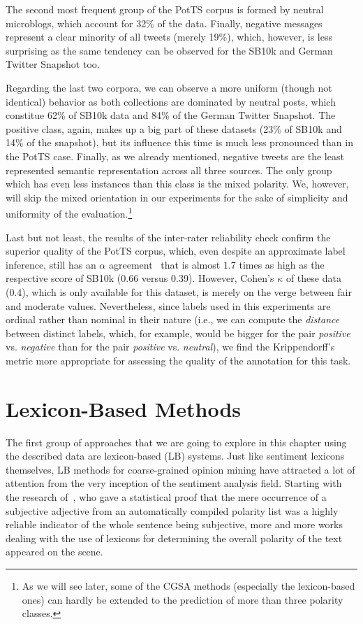 The second most frequent group of the PotTS corpus is formed by
neutral microblogs, which account for 32\% of the data.  Finally,
negative messages represent a clear minority of all tweets (merely
19\%), which, however, is less surprising as the same tendency can be
observed for the SB10k and German Twitter Snapshot too.

Regarding the last two corpora, we can observe a more uniform (though
not identical) behavior as both collections are dominated by neutral
posts, which constitue 62\% of SB10k data and 84\% of the German
Twitter Snapshot.  The positive class, again, makes up a big part of
these datasets (23\% of SB10k and 14\% of the snapshot), but its
influence this time is much less pronounced than in the PotTS case.
Finally, as we already mentioned, negative tweets are the least
represented semantic representation across all three sources.  The
only group which has even less instances than this class is the mixed
polarity.  We, however, will skip the mixed orientation in our
experiments for the sake of simplicity and uniformity of the
evaluation.\footnote{As we will see later, some of the CGSA methods
  (especially the lexicon-based ones) can hardly be extended to the
  prediction of more than three polarity classes.}

Last but not least, the results of the inter-rater reliability check
confirm the superior quality of the PotTS corpus, which, even despite
an approximate label inference, still has an $\alpha$
agreement~\cite{Krippendorff:07} that is almost 1.7 times as high as
the respective score of SB10k (0.66 versus 0.39).  However, Cohen's
$\kappa$ of these data (0.4), which is only available for this
dataset, is merely on the verge between fair and moderate values.
Nevertheless, since labels used in this experiments are ordinal rather
than nominal in their nature (i.e., we can compute the \emph{distance}
between distinct labels, which, for example, would be bigger for the
pair \emph{positive} vs. \emph{negative} than for the pair
\emph{positive} vs. \emph{neutral}), we find the Krippendorff's metric
more appropriate for assessing the quality of the annotation for this
task.

\section{Lexicon-Based Methods}\label{sec:cgsa:lexicon-based}

The first group of approaches that we are going to explore in this
chapter using the described data are lexicon-based (LB) systems.  Just
like sentiment lexicons themselves, LB methods for coarse-grained
opinion mining have attracted a lot of attention from the very
inception of the sentiment analysis field.  Starting with the research
of~\citet{Hatzivassi:00}, who gave a statistical proof that the mere
occurrence of a subjective adjective from an automatically compiled
polarity list was a highly reliable indicator of the whole sentence
being subjective, more and more works dealing with the use of lexicons
for determining the overall polarity of the text appeared on the
scene.

